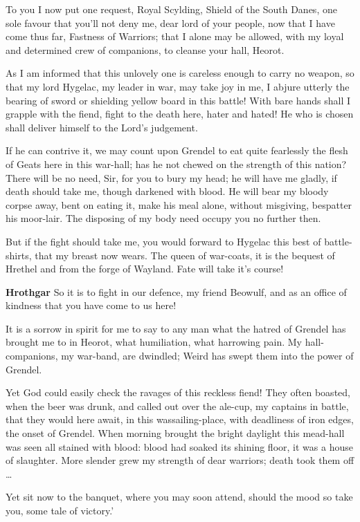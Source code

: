 \documentclass[a4paper]{article}
\begin{document}
{To you I now
put one request, Royal Scylding,
Shield of the South Danes, one sole favour
that you’ll not deny me, dear lord of your people,
now that I have come thus far, Fastness of Warriors;
that I alone may be allowed, with my loyal and determined
crew of companions, to cleanse your hall, Heorot.

As I am informed that this unlovely one
is careless enough to carry no weapon,
so that my lord Hygelac, my leader in war,
may take joy in me, I abjure utterly
the bearing of sword or shielding yellow
board in this battle! With bare hands shall I
grapple with the fiend, fight to the death here,
hater and hated! He who is chosen
shall deliver himself to the Lord’s judgement.

If he can contrive it, we may count upon Grendel
to eat quite fearlessly the flesh of Geats
here in this war-hall; has he not chewed
on the strength of this nation? There will be no need, Sir,
for you to bury my head; he will have me gladly,
if death should take me, though darkened with blood.
He will bear my bloody corpse away, bent on eating it,
make his meal alone, without misgiving,
bespatter his moor-lair. The disposing of my body
need occupy you no further then.

But if the fight should take me, you would forward to Hygelac
this best of battle-shirts, that my breast now wears.
The queen of war-coats, it is the bequest of Hrethel
and from the forge of Wayland. 
Fate will take it's course!

\textbf{Hrothgar} So it is to fight in our defence, my friend Beowulf,
and as an office of kindness that you have come to us here!

It is a sorrow in spirit for me to say to any man
what the hatred of Grendel has brought me to in Heorot, 
what humiliation, what harrowing pain. 
My hall-companions, my war-band, are dwindled; 
Weird has swept them into the power of Grendel.

Yet God could easily check the ravages of this reckless fiend!
They often boasted, when the beer was drunk,
and called out over the ale-cup, my captains in battle,
that they would here await, in this wassailing-place,
with deadliness of iron edges, the onset of Grendel.
When morning brought the bright daylight
this mead-hall was seen all stained with blood:
blood had soaked its shining floor,
it was a house of slaughter. More slender grew my
strength of dear warriors; death took them off …

Yet sit now to the banquet, where you may soon attend,
should the mood so take you, some tale of victory.’

}
\end{document}
